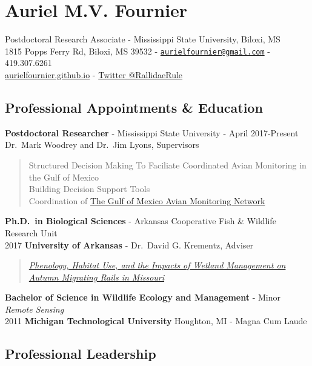 \documentclass[]{article}
\title{}
\author{}
\date{}
\begin{document}
\section{Auriel M.V. Fournier}\label{auriel-m.v.-fournier}

Postdoctoral Research Associate - Mississippi State University, Biloxi,
MS\\
1815 Popps Ferry Rd, Biloxi, MS 39532 -
\href{mailto:aurielfournier@gmail.com}{\nolinkurl{aurielfournier@gmail.com}}
- 419.307.6261\\
\href{http://aurielfournier.github.io/}{aurielfournier.github.io} -
\href{https://twitter.com/RallidaeRule}{Twitter @RallidaeRule}

\subsection{Professional Appointments \&
Education}\label{professional-appointments-education}

\textbf{Postdoctoral Researcher} - Mississippi State University - April
2017-Present\\
Dr.~Mark Woodrey and Dr.~Jim Lyons, Supervisors

\begin{quote}
Structured Decision Making To Faciliate Coordinated Avian Monitoring in
the Gulf of Mexico\\
Building Decision Support Tools\\
Coordination of \href{gomamn.org}{The Gulf of Mexico Avian Monitoring
Network}
\end{quote}

\textbf{Ph.D.~in Biological Sciences} - Arkansas Cooperative Fish \&
Wildlife Research Unit\\
2017 \textbf{University of Arkansas} - Dr.~David G. Krementz, Adviser

\begin{quote}
\href{http://pqdtopen.proquest.com/doc/1879756773.html?FMT=ABS}{\emph{Phenology,
Habitat Use, and the Impacts of Wetland Management on Autumn Migrating
Rails in Missouri}}
\end{quote}

\textbf{Bachelor of Science in Wildlife Ecology and Management} - Minor
\emph{Remote Sensing}\\
2011 \textbf{Michigan Technological University} Houghton, MI - Magna Cum
Laude

\subsection{Professional Leadership}\label{professional-leadership}
\end{document}
